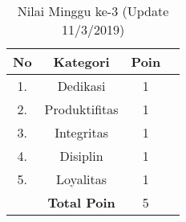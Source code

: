 \begin{table}[htp]
\centering
\caption{Nilai Minggu ke-3 (Update 11/3/2019)}
\label{tab:nm02}
\begin{tabular}{|c|c|c|p{\textwidth}|}
\hline
\textbf{No} & \textbf{Kategori} & \textbf{Poin} \\ \hline
1. & Dedikasi & 1 \\ \hline
2. & Produktifitas & 1 \\ \hline
3. & Integritas & 1 \\ \hline
4. & Disiplin & 1 \\ \hline
5. & Loyalitas & 1 \\ \hline
 & \textbf{Total Poin} & 5 \\ \hline
\end{tabular}
\end{table}


